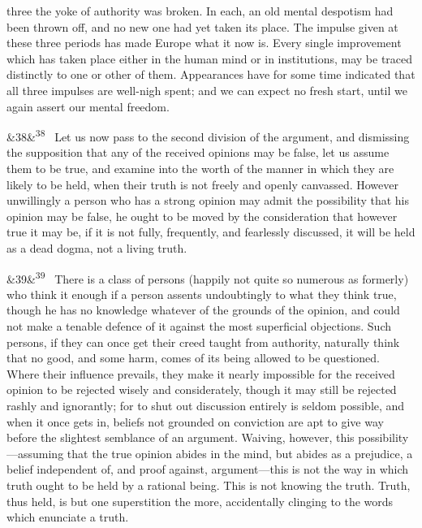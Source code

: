 \documentclass[12pt]{article}
\newcommand{\para}[1][]{\par\noindent\ifx&#1&\else\textsuperscript{\footnotesize #1}~\fi}
\begin{document}
three the yoke of authority was broken. In each, an old mental despotism had been thrown off, and no new one had yet taken its place. The impulse given at these three periods has made Europe what it now is. Every single improvement which has taken place either in the human mind or in institutions, may be traced distinctly to one or other of them. Appearances have for some time indicated that all three impulses are well-nigh spent; and we can expect no fresh start, until we again assert our mental freedom.

\para[38] Let us now pass to the second division of the argument, and dismissing the supposition that any of the received opinions may be false, let us assume them to be true, and examine into the worth of the manner in which they are likely to be held, when their truth is not freely and openly canvassed. However unwillingly a person who has a strong opinion may admit the possibility that his opinion may be false, he ought to be moved by the consideration that however true it may be, if it is not fully, frequently, and fearlessly discussed, it will be held as a dead dogma, not a living truth.

\para[39] There is a class of persons (happily not quite so numerous as formerly) who think it enough if a person assents undoubtingly to what they think true, though he has no knowledge whatever of the grounds of the opinion, and could not make a tenable defence of it against the most superficial objections. Such persons, if they can once get their creed taught from authority, naturally think that no good, and some harm, comes of its being allowed to be questioned. Where their influence prevails, they make it nearly impossible for the received opinion to be rejected wisely and considerately, though it may still be rejected rashly and ignorantly; for to shut out discussion entirely is seldom possible, and when it once gets in, beliefs not grounded on conviction are apt to give way before the slightest semblance of an argument. Waiving, however, this possibility---assuming that the true opinion abides in the mind, but abides as a prejudice, a belief independent of, and proof against, argument---this is not the way in which truth ought to be held by a rational being. This is not knowing the truth. Truth, thus held, is but one superstition the more, accidentally clinging to the words which enunciate a truth.
\end{document}

